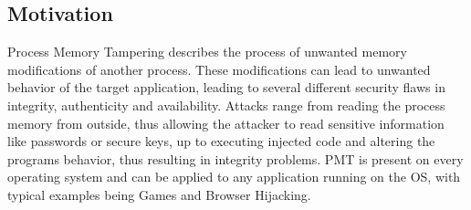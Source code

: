 \subsection{Motivation}
Process Memory Tampering describes the process of unwanted memory modifications of another process. These modifications can lead to unwanted behavior of the target application, leading to several different security flaws in integrity, authenticity and availability. Attacks range from reading the process memory from outside, thus allowing the attacker to read sensitive information like passwords or secure keys, up to executing injected code and altering the programs behavior, thus resulting in integrity problems. PMT is present on every operating system and can be applied to any application running on the OS, with typical examples being Games and Browser Hijacking.

